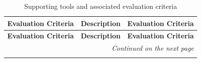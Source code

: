 \documentclass{template/openetcs_article}
\begin{document}
  
    \begin{longtable}[htbp]{p{4cm}|p{5cm}|p{5cm}}
    
    \caption{Supporting tools and associated evaluation criteria}   
    \label{ToolEvalCrit} \\
    
          \textbf{Evaluation Criteria} & \textbf{Description} & \textbf{Evaluation Criteria} \\
            \hline
        \endfirsthead
        
        \textbf{Evaluation Criteria} & \textbf{Description} & \textbf{Evaluation Criteria} \\
        \hline
        \endhead
        
        \hline\multicolumn{3}{r}{\textit{Continued on the next page}}\\\hline
        \endfoot
        \hline
        \endlastfoot
    

\end{longtable}
\end{document}

